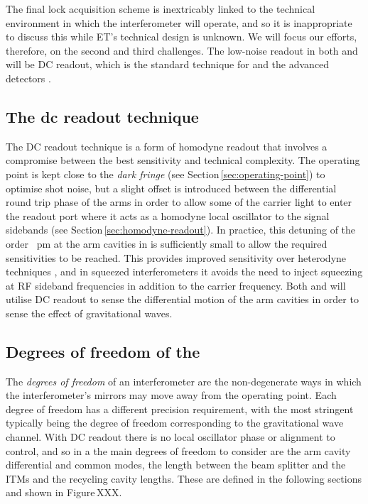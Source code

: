 The final lock acquisition scheme is inextricably linked to the technical environment in which the interferometer will operate, and so it is inappropriate to discuss this while \gls{ET}'s technical design is unknown. We will focus our efforts, therefore, on the second and third challenges. The low-noise readout in both \ETLF{} and \ETHF{} will be \gls{DC} readout, which is the standard technique for \GEOHF{} and the advanced detectors \cite{Hild2007, Ward2008, Fricke2012}.

\subsection{The dc readout technique}
The \gls{DC} readout technique is a form of homodyne readout that involves a compromise between the best sensitivity and technical complexity. The operating point is kept close to the \emph{dark fringe} (see Section\,\ref{sec:operating-point}) to optimise shot noise, but a slight offset is introduced between the differential round trip phase of the arms in order to allow some of the carrier light to enter the readout port where it acts as a homodyne local oscillator to the signal sidebands (see Section\,\ref{sec:homodyne-readout}). In practice, this detuning \textemdash of the order \SI{}{\pico\meter} at the arm cavities in \ALIGO{}\textemdash is sufficiently small to allow the required sensitivities to be reached. This provides improved sensitivity over heterodyne techniques \cite{Fricke2012}, and in squeezed interferometers it avoids the need to inject squeezing at \gls{RF} sideband frequencies in addition to the carrier frequency. Both \ETLF{} and \ETHF{} will utilise \gls{DC} readout to sense the differential motion of the arm cavities in order to sense the effect of gravitational waves.

\subsection{\label{sec:dofs-of-drfpmi}Degrees of freedom of the \DRFPMI{}}
The \emph{degrees of freedom} of an interferometer are the non-degenerate ways in which the interferometer's mirrors may move away from the operating point. Each degree of freedom has a different precision requirement, with the most stringent typically being the degree of freedom corresponding to the gravitational wave channel. With \gls{DC} readout there is no local oscillator phase or alignment to control, and so in a \DRFPMI{} the main degrees of freedom to consider are the arm cavity differential and common modes, the length between the beam splitter and the \glspl{ITM} and the recycling cavity lengths. These are defined in the following sections and shown in Figure\,XXX.

